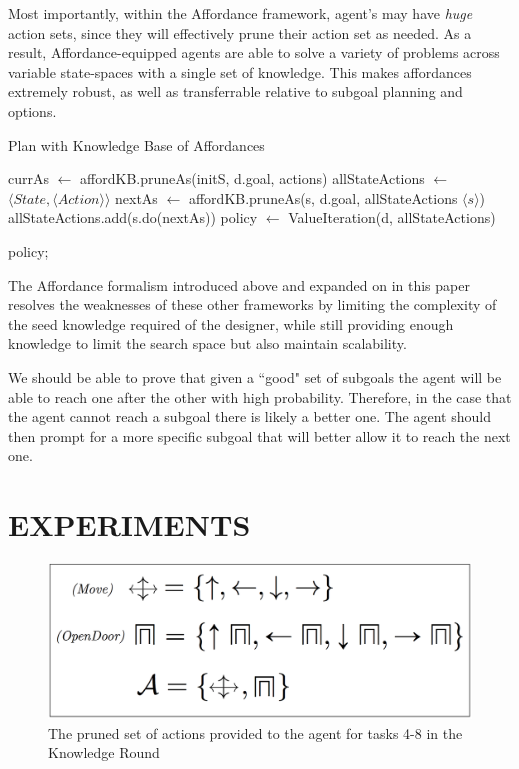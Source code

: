 \documentclass[]{article}
\begin{document}
Most importantly, within the Affordance framework, agent's may have {\it huge} action sets, since they will effectively prune their action set as needed. As a result, Affordance-equipped agents are able to solve a variety of problems across variable state-spaces with a single set of knowledge. This makes affordances extremely robust, as well as transferrable relative to subgoal planning and options.


\begin{algorithm}
  \caption{Plan with Knowledge Base of Affordances}

  \begin{algorithmic}
    \State {}
    \State currAs $\gets$ affordKB.pruneAs(initS, d.goal, actions)
    \State allStateActions $\gets$ $\langle State ,\langle Action \rangle \rangle$
	\State nextAs $\gets$ affordKB.pruneAs(s, d.goal, allStateActions $\langle s \rangle$)
	\State allStateActions.add(s.do(nextAs))
    \EndFor
    \State {}
    \State policy $\gets$ ValueIteration(d, allStateActions)
    
    \Return policy;
  \end{algorithmic}
\end{algorithm}


The Affordance formalism introduced above and expanded on in this paper resolves the weaknesses of these other frameworks by limiting the complexity of the seed knowledge required of the designer, while still providing enough knowledge to limit the search space but also maintain scalability.

We should be able to prove that given a ``good" set of subgoals the agent will be able to reach one after the other with high probability. Therefore, in the case that the agent cannot reach a subgoal there is likely a better one. The agent should then prompt for a more specific subgoal that will better allow it to reach the next one.

\section{EXPERIMENTS}

\begin{figure}
\centering
\includegraphics[scale=0.2]{figures/reg_actions.png}
\caption{The pruned set of actions provided to the agent for tasks 4-8 in the Knowledge Round \label{fig:reg_actions}}
\end{figure}
\end{document}
